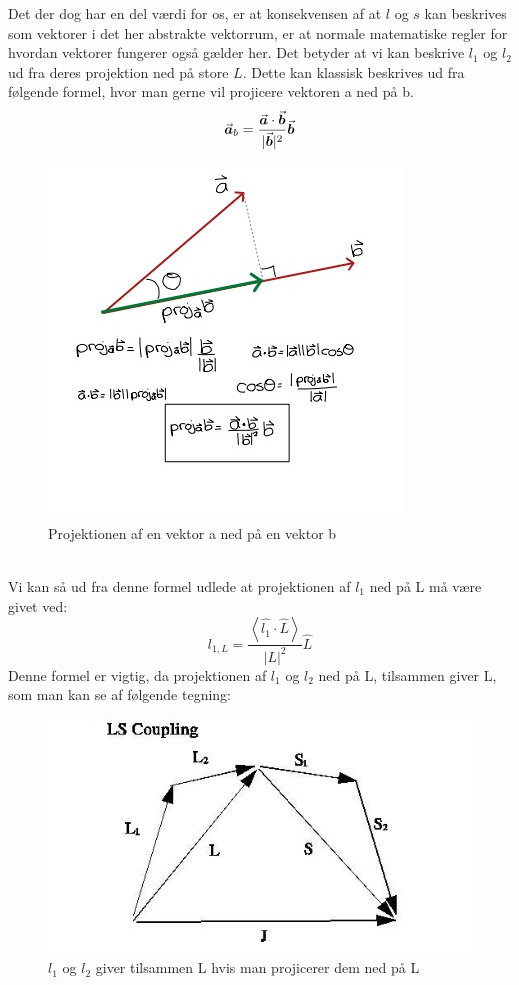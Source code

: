\documentclass[../../Atom-ogMolekylefysik.tex]{subfiles}
\begin{document}
Det der dog har en del værdi for os, er at konsekvensen af at $l$ og $s$ kan beskrives som vektorer i det her abstrakte vektorrum, er at normale matematiske regler for hvordan vektorer fungerer også gælder her. Det betyder at vi kan beskrive $l_1$ og $l_2$ ud fra deres projektion ned på store $L$. 
Dette kan klassisk beskrives ud fra følgende formel, hvor man gerne vil projicere vektoren a ned på b.
\begin{equation}
    {\vec{\boldsymbol{a}}}_b = \frac{{\vec{\boldsymbol{a}}}\cdot {\vec{\boldsymbol{b}}}}{|{{\vec{\boldsymbol{b}}}}|^2}{\vec{\boldsymbol{b}}}
\end{equation}
\begin{figure}[h]
    \centering
    \includegraphics[scale=0.5]{Atom-ogMolekylefysik/billeder/projection.jpg}
    \caption{Projektionen af en vektor a ned på en vektor b}
    \label{fig:amo:vektor-projektion}
\end{figure}\\
Vi kan så ud fra denne formel udlede at projektionen af $l_1$ ned på L må være givet ved:
\begin{equation}
    l_{1,L}=\frac{\left<\hat{l_1}\cdot\hat{L}\right>}{|L|^2}\hat{L}
\end{equation}
Denne formel er vigtig, da projektionen af $l_1$ og $l_2$ ned på L, tilsammen giver L, som man kan se af følgende tegning:
\begin{figure}[h]
    \centering
    \includegraphics[scale=0.5]{Atom-ogMolekylefysik/billeder/LS-vektor.jpg}
    \caption{${l_1}$ og $l_2$ giver tilsammen L hvis man projicerer dem ned på L}
    \label{fig:amo:vektor-projektion}
\end{figure}\\
\end{document}
